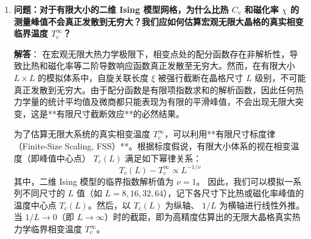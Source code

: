 \documentclass[11pt]{article}
\begin{document}
\begin{enumerate}
    要克服这一难题，可以引入**集体（聚类）翻转算法（Cluster Algorithms）**，如 **Wolff 算法** 或 **Swendsen-Wang 算法**。这些算法不是单个翻转自旋，而是通过链键连接概率将关联的近邻自旋归为一个“畴簇”（Cluster），然后以 100\% 的概率一次性将整个自旋畴簇翻转，其动力学指数 $z$ 近乎为 0。这极大地克服了临界慢化，让临界温度下的采样效率提升数个数量级。

    \item \textbf{问题：对于有限大小的二维 Ising 模型网格，为什么比热 $C_v$ 和磁化率 $\chi$ 的测量峰值不会真正发散到无穷大？我们应如何估算宏观无限大晶格的真实相变临界温度 $T_c^{\infty}$？}
    
    \textbf{解答}：
    在宏观无限大热力学极限下，相变点处的配分函数存在非解析性，导致比热和磁化率等二阶导数响应函数真正发散至无穷大。然而，在有限大小 $L \times L$ 的模拟体系中，自旋关联长度 $\xi$ 被强行截断在晶格尺寸 $L$ 级别，不可能真正发散到无穷大。由于配分函数是有限项指数求和的解析函数，因此任何热力学量的统计平均值及微商都只能表现为有限的平滑峰值，不会出现无限大突变，这是**有限尺寸截断效应**的必然结果。
    
    为了估算无限大系统的真实相变温度 $T_c^{\infty}$，可以利用**有限尺寸标度律（Finite-Size Scaling, FSS）**。根据标度假说，有限大小体系的视在相变温度（即峰值中心点） $T_c(L)$ 满足如下幂律关系：
    \begin{equation}
        T_c(L) - T_c^\infty \propto L^{-1/\nu}
    \end{equation}
    其中，二维 Ising 模型的临界指数解析值为 $\nu = 1$。
    因此，我们可以模拟一系列不同尺寸的 $L$ 值（如 $L=8, 16, 32, 64$），记下各尺寸下比热或磁化率峰值的温度中心点 $T_c(L)$。然后，以 $T_c(L)$ 为纵轴、 $1/L$ 为横轴进行线性外推。当 $1/L \to 0$（即 $L \to \infty$）时的截距，即为高精度估算出的无限大晶格真实热力学临界相变温度 $T_c^{\infty}$。
\end{enumerate}
\end{document}
